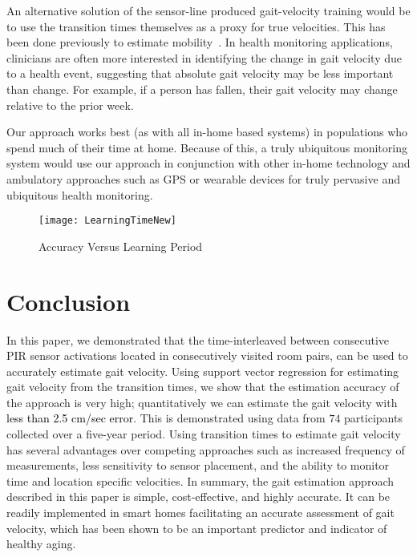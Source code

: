 \documentclass[journal]{IEEEtran}
\newcommand{\RR}[1]{\textcolor{black}{#1}}
\begin{document}
An alternative solution of the sensor-line produced gait-velocity training would be to use the transition times themselves as a proxy for true velocities.  This has been done previously to estimate mobility~\cite{Austin2014}.  In health monitoring applications, clinicians are often more interested in identifying the change in gait velocity due to a health event, suggesting that absolute gait velocity may be less important than change.  For example, if a person has fallen, their gait velocity may change relative to the prior week.

Our approach works best (as with all in-home based systems) in populations who spend much of their time at home.  Because of this, a truly ubiquitous monitoring system would use our approach in conjunction with other in-home technology and ambulatory approaches such as GPS or wearable devices for truly pervasive and ubiquitous health monitoring. 





\begin{figure}
\centering
\texttt{[image: LearningTimeNew]}
\caption{Accuracy Versus Learning Period}
\label{fig:LearningTimeNew}
\end{figure}

\section{Conclusion}
In this paper, we demonstrated that the time-interleaved between consecutive PIR sensor activations located in consecutively visited room pairs, can be used to accurately estimate gait velocity.   Using support vector regression for estimating gait velocity from the transition times, we show that the estimation accuracy of the approach is very high; quantitatively we can estimate the gait velocity with \RR{less than 2.5 cm/sec error}.  This is demonstrated using data from $74$ participants collected over a five-year period.  Using transition times to estimate gait velocity has several advantages over competing approaches such as increased frequency of measurements, less sensitivity to sensor placement, and the ability to monitor time and location specific velocities.  In summary, the gait estimation approach described in this paper is simple, cost-effective, and highly accurate. It can be readily implemented in smart homes facilitating an accurate assessment of gait velocity, which has been shown to be an important predictor and indicator of healthy aging.
\end{document}
